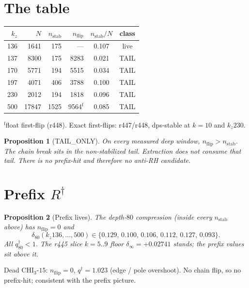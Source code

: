 \documentclass[11pt]{article}
\newtheorem{prop}{Proposition}
\begin{document}
\section{The table}\label{sec:tab}

\begin{center}
\small
\begin{tabular}{rrrrcc}
\toprule
$k_z$ & $N$ & $n_{\mathrm{stab}}$ & $n_{\mathrm{flip}}$
& $n_{\mathrm{stab}}/N$ & class \\
\midrule
136 & 1641 & 175 & --- & 0.107 & live \\
137 & 8300 & 175 & 8283 & 0.021 & TAIL \\
170 & 5771 & 194 & 5515 & 0.034 & TAIL \\
197 & 4071 & 406 & 3788 & 0.100 & TAIL \\
230 & 2012 & 194 & 1818 & 0.096 & TAIL \\
500 & 17847 & 1525 & 9564$^{\mathrm{f}}$ & 0.085 & TAIL \\
\bottomrule
\end{tabular}
\end{center}

$^{\mathrm{f}}$float first-flip (r448).
Exact first-flips: r447/r448, dps-stable at
$k=10$ and $k_z230$.

\begin{prop}[TAIL\_ONLY]\label{prop:tail}
On every measured deep window,
$n_{\mathrm{flip}}>n_{\mathrm{stab}}$.
The chain break sits in the non-stabilized
tail.  Extraction does not consume that tail.
There is no prefix-hit and therefore no
anti-RH candidate.
\end{prop}

\section{Prefix $R^{\dagger}$}\label{sec:pref}

\begin{prop}[Prefix lives]\label{prop:prefix}
The depth-$80$ compression (inside every
$n_{\mathrm{stab}}$ above) has
$n_{\mathrm{flip}}=0$ and
\[
\delta_{80}(k_z136,\ldots,500)
\in\{0.129,\,0.100,\,0.106,\,0.112,\,0.127,\,0.093\}.
\]
All $q^{\dagger}_{80}<1$.
The r445 slice $k=5..9$ floor
$\delta_\infty=+0.02741$ stands; the prefix
values sit \emph{above} it.
\end{prop}

Dead CHI$_3$-$15$: $n_{\mathrm{flip}}=0$,
$q^{\dagger}=1.023$ (edge / pole overshoot).
No chain flip, so no prefix-hit; consistent
with the prefix picture.
\end{document}
